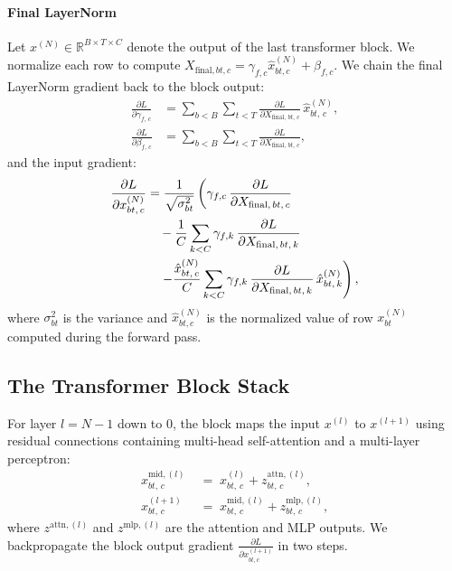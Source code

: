 \documentclass[letterpaper, 10 pt, conference]{ieeeconf}
\newcommand{\R}{\mathbb{R}}
\newcommand{\pdv}[2]{\frac{\partial #1}{\partial #2}}
\newcommand{\dL}[1]{\pdv{L}{#1}}
\theoremstyle{definition}
\begin{document}
\paragraph{Final LayerNorm}
Let $x^{(N)} \in \R^{B \times T \times C}$ denote the output of the last transformer block. We normalize each row to compute $X_{\text{final}, bt, c} = \gamma_{f, c} \hat{x}^{(N)}_{bt, c} + \beta_{f, c}$. We chain the final LayerNorm gradient back to the block output:
\begin{align}
  \dL{\gamma_{f,\, c}}
   & = \sum_{b<B} \sum_{t<T} \dL{X_{\text{final},\, bt,\, c}}\,\hat{x}^{(N)}_{bt,\, c},
  \label{eq:full-dgamma-f}                                                              \\
  \dL{\beta_{f,\, c}}
   & = \sum_{b<B} \sum_{t<T} \dL{X_{\text{final},\, bt,\, c}},
  \label{eq:full-dbeta-f}
\end{align}
and the input gradient:
\begin{align}
  \dL{x^{(N)}_{bt,\, c}}
   & = \frac{1}{\sqrt{\sigma^2_{bt}}} \left( \gamma_{f, c}\,\dL{X_{\text{final},\, bt,\, c}} \right. \notag                                        \\
   & \quad - \frac{1}{C} \sum_{k<C} \gamma_{f, k}\,\dL{X_{\text{final},\, bt,\, k}} \notag                                                         \\
   & \quad \left. - \frac{\hat{x}^{(N)}_{bt,\, c}}{C} \sum_{k<C} \gamma_{f, k}\,\dL{X_{\text{final},\, bt,\, k}}\,\hat{x}^{(N)}_{bt,\, k} \right),
  \label{eq:full-dxn}
\end{align}
where $\sigma^2_{bt}$ is the variance and $\hat{x}^{(N)}_{bt, c}$ is the normalized value of row $x^{(N)}_{bt}$ computed during the forward pass.

\subsection{The Transformer Block Stack}

For layer $l = N - 1$ down to $0$, the block maps the input $x^{(l)}$ to $x^{(l+1)}$ using residual connections \cite{resnet} containing multi-head self-attention \cite{attention} and a multi-layer perceptron:
\begin{align}
  x^{\text{mid}, (l)}_{bt,\, c} \; & =\; x^{(l)}_{bt,\, c} + z^{\text{attn}, (l)}_{bt,\, c},            \\
  x^{(l+1)}_{bt,\, c} \;           & =\; x^{\text{mid}, (l)}_{bt,\, c} + z^{\text{mlp}, (l)}_{bt,\, c},
\end{align}
where $z^{\text{attn}, (l)}$ and $z^{\text{mlp}, (l)}$ are the attention and MLP outputs. We backpropagate the block output gradient $\dL{x^{(l+1)}_{bt, c}}$ in two steps.
\end{document}
